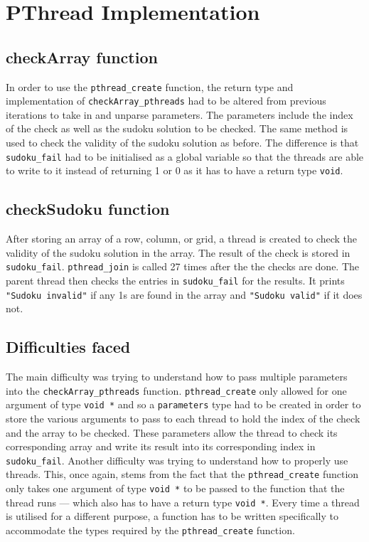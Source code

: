 \documentclass[parallelismlabreport.tex]{subfiles}
\begin{document}
\section{PThread Implementation}
\subsection{checkArray function}
In order to use the \verb|pthread_create| function, the return type and implementation of \verb|checkArray_pthreads| had to be altered from previous iterations to take in and unparse parameters. The parameters include the index of the check as well as the sudoku solution to be checked. The same method is used to check the validity of the sudoku solution as before. The difference is that \verb|sudoku_fail| had to be initialised as a global variable so that the threads are able to write to it instead of returning 1 or 0 as it has to have a return type \verb|void|.

\subsection{checkSudoku function}
After storing an array of a row, column, or grid, a thread is created to check the validity of the sudoku solution in the array. The result of the check is stored in \verb|sudoku_fail|. \verb|pthread_join| is called 27 times after the the checks are done. The parent thread then checks the entries in \verb|sudoku_fail| for the results. It prints \verb|"Sudoku invalid"| if any 1s are found in the array and \verb|"Sudoku valid"| if it does not.

\subsection{Difficulties faced}
The main difficulty was trying to understand how to pass multiple parameters into the \verb|checkArray_pthreads| function. \verb|pthread_create| only allowed for one argument of type \verb|void *| and so a \verb|parameters| type had to be created in order to store the various arguments to pass to each thread to hold the index of the check and the array to be checked.
These parameters allow the thread to check its corresponding array and write its result into its corresponding index in \verb|sudoku_fail|. Another difficulty was trying to understand how to properly use threads. This, once again, stems from the fact that the \verb|pthread_create| function only takes one argument of type \verb|void *| to be passed to the function that the thread runs --- which also has to have a return type \verb|void *|. Every time a thread is utilised for a different purpose, a function has to be written specifically to accommodate the types required by the \verb|pthread_create| function.
\end{document}

